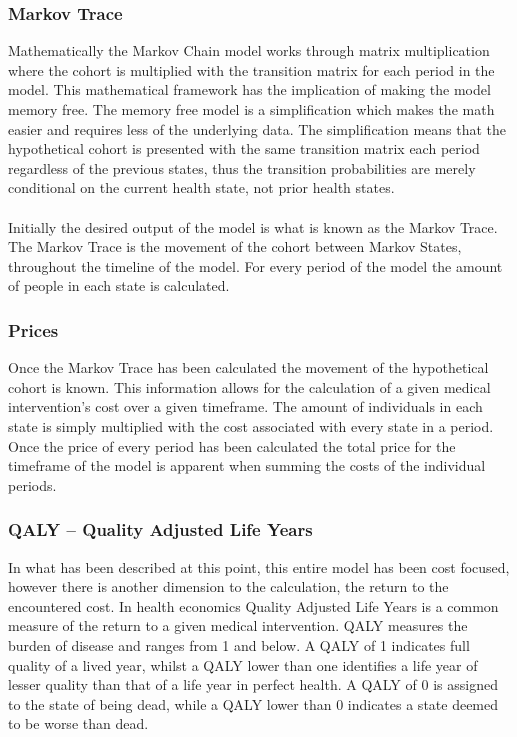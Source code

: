 \documentclass[a4paper,12pt]{article}
\begin{document}
\subsubsection*{Markov Trace}
Mathematically the Markov Chain model works through matrix multiplication where the cohort is multiplied with the transition matrix for each period in the model. This mathematical framework has the implication of making the model memory free. The memory free model is a simplification which makes the math easier and requires less of the underlying data. The simplification means that the hypothetical cohort is presented with the same transition matrix each period regardless of the previous states, thus the transition probabilities are merely conditional on the current health state, not prior health states. 
\\\\
Initially the desired output of the model is what is known as the Markov Trace. The Markov Trace is the movement of the cohort between Markov States, throughout the timeline of the model. For every period of the model the amount of people in each state is calculated.

\subsubsection*{Prices}
Once the Markov Trace has been calculated the movement of the hypothetical cohort is known. This information allows for the calculation of a given medical intervention’s cost over a given timeframe. The amount of individuals in each state is simply multiplied with the cost associated with every state in a period. Once the price of every period has been calculated the total price for the timeframe of the model is apparent when summing the costs of the individual periods.

\subsubsection*{QALY – Quality Adjusted Life Years}
In what has been described at this point, this entire model has been cost focused, however there is another dimension to the calculation, the return to the encountered cost. In health economics Quality Adjusted Life Years is a common measure of the return to a given medical intervention. QALY measures the burden of disease and ranges from 1 and below. A QALY of 1 indicates full quality of a lived year, whilst a QALY lower than one identifies a life year of lesser quality than that of a life year in perfect health. A QALY of 0 is assigned to the state of being dead, while a QALY lower than 0 indicates a state deemed to be worse than dead. 
\end{document}
